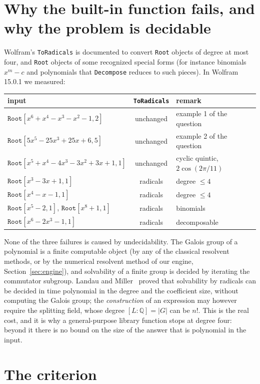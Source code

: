 \documentclass[11pt,a4paper]{article}
\theoremstyle{definition}
\theoremstyle{remark}
\newcommand{\Q}{\mathbb{Q}}
\newcommand{\code}[1]{\texttt{#1}}
\newcommand{\Root}{\code{Root}}
\newcommand{\ToRadicals}{\code{ToRadicals}}
\begin{document}
\section{Why the built-in function fails, and why the problem is decidable}\label{sec:builtin}

Wolfram's \ToRadicals{} is documented to convert \Root{} objects of degree at most four,
and \Root{} objects of some recognized special forms (for instance binomials
$x^m-c$ and polynomials that \code{Decompose} reduces to such pieces).  In Wolfram
15.0.1 we measured:

\begin{center}
\begin{tabular}{@{}lcl@{}}
\toprule
input & \ToRadicals & remark\\
\midrule
$\Root[x^6+x^4-x^3-x^2-1,2]$ & unchanged & example 1 of the question\\
$\Root[5x^5-25x^3+25x+6,5]$ & unchanged & example 2 of the question\\
$\Root[x^5+x^4-4x^3-3x^2+3x+1,1]$ & unchanged & cyclic quintic, $2\cos(2\pi/11)$\\
$\Root[x^3-3x+1,1]$ & radicals & degree $\le 4$\\
$\Root[x^4-x-1,1]$ & radicals & degree $\le 4$\\
$\Root[x^5-2,1]$, $\Root[x^8+1,1]$ & radicals & binomials\\
$\Root[x^6-2x^3-1,1]$ & radicals & decomposable\\
\bottomrule
\end{tabular}
\end{center}

None of the three failures is caused by undecidability.  The Galois group of a
polynomial is a finite computable object (by any of the classical resolvent methods, or
by the numerical resolvent method of our engine, Section~\ref{sec:engine}), and
solvability of a finite group is decided by iterating the commutator subgroup.
Landau and Miller~\cite{LandauMiller} proved that solvability by radicals can be decided
in time polynomial in the degree and the coefficient size, without computing the Galois
group; the \emph{construction} of an expression may however require the splitting field,
whose degree $[L:\Q]=|G|$ can be $n!$.  This is the real cost, and it is why a
general-purpose library function stops at degree four: beyond it there is no bound on
the size of the answer that is polynomial in the input.

\section{The criterion}\label{sec:criterion}
\end{document}
